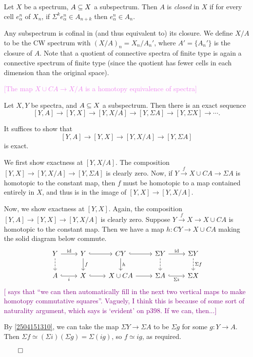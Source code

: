 \documentclass{MetricNotes2023}
\def\subq{\ensuremath\subseteq}
\def\id{\ensuremath\text{id}}
\def\done{\begin{flushright}\vspace{-4.35ex}\(\qed\)\end{flushright}}
\def\textcolour{\textcolor}
\begin{document}
\begin{definition}
Let \(X\) be a spectrum, \(A\subq X\) a subspectrum. Then \(A\) is \textit{closed} in \(X\) if for every cell \(e_\alpha^n\) of \(X_n\), if \(\Sigma^k e_\alpha^n \in A_{n+k}\) then \(e_\alpha^n \in A_n\). 
\end{definition}

Any subspectrum is cofinal in (and thus equivalent to) its closure. We define \(X/A\) to be the CW spectrum with \((X/A)_n=X_n/A_n'\), where \(A'=\{A_n'\}\) is the closure of \(A\). Note that a quotient of connective spectra of finite type is again a connective spectrum of finite type (since the quotient has fewer cells in each dimension than the original space).

\textcolour{violet}{[The map \(X\cup CA\to X/A\) is a homotopy equivalence of spectra]}

\begin{theorem}\label{2504151709}
Let \(X,Y\) be spectra, and \(A\subq X\) a subspectrum. Then there is an exact sequence
\[[Y,A]\to[Y,X]\to[Y,X/A]\to[Y,\Sigma A]\to[Y,\Sigma X]\to\cdots.\]
\end{theorem}

\begin{ourproof}
It suffices to show that 
\[[Y,A]\to [Y,X]\to [Y, X/A]\to [Y, \Sigma A]\]
is exact. 

We first show exactness at \([Y,X/A]\). The composition \([Y, X]\to [Y, X/A]\to [Y, \Sigma A]\) is clearly zero. Now, if \(Y \xrightarrow{f} X\cup CA \to \Sigma A\) is homotopic to the constant map, then \(f\) must be homotopic to a map contained entirely in \(X\), and thus is in the image of \([Y,X]\to [Y,X/A]\).

Now, we show exactness at \([Y,X]\). Again, the composition \([Y,A]\to [Y,X]\to [Y,X/A]\) is clearly zero. Suppose \(Y \xrightarrow{f} X \to X\cup CA\) is homotopic to the constant map. Then we have a map \(h : CY \to X\cup CA\) making the solid diagram below commute.
\[\begin{tikzcd} 
Y \arrow[r, "\id"] \arrow[d, swap, "", dashrightarrow]  & Y \arrow[r, "", hookrightarrow] \arrow[d, "f"] & CY \arrow[d, "h"] \arrow[r, "", hookrightarrow] & \Sigma Y \arrow[d, "", dashrightarrow] \arrow[r, "\id"] & \Sigma Y \arrow[d, "\Sigma f", dashrightarrow]\\ 
 A \arrow[r, swap, "i", hookrightarrow]  & X \arrow[r, ""', hookrightarrow] & X\cup CA \arrow[r, ""'] & \Sigma A \arrow[r, "\Sigma i"', hookrightarrow] & \Sigma X 
 \end{tikzcd}\] 
\textcolour{purple}{[\autocite{hatcher5} says that ``we can then automatically fill in the next two vertical maps to make homotopy commutative squares''. Vaguely, I think this is because of some sort of naturality argument, which \autocite{hatcher} says is `evident' on p398. If we can, then...]}

By \ref{2504151310}, we can take the map \(\Sigma Y \to \Sigma A\) to be \(\Sigma g\) for some \(g : Y \to A\). Then \(\Sigma f \simeq (\Sigma i)(\Sigma g)=\Sigma(ig)\), so \(f\simeq ig\), as required.\done
\end{ourproof}
\end{document}
